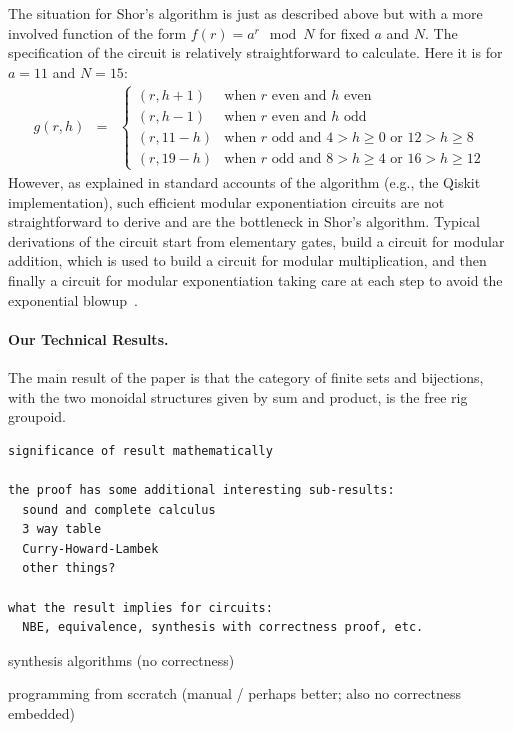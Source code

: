 The situation for Shor's algorithm is just as described above but with a more involved function of the form $f(r) = a^{r} \mod N$ for fixed $a$ and $N$. The specification of the circuit is relatively straightforward to calculate. Here it is for $a=11$ and $N=15$:
\[\begin{array}{rcll}
g(r,h) &=& \left\{ \begin{array}{ll}
                     (r,h+1) & \mbox{when~$r$~even~and~$h$~even} \\
                     (r,h-1) & \mbox{when~$r$~even~and~$h$~odd} \\
                     (r,11-h) & \mbox{when~$r$~odd~and~$4 > h \geq 0$~or~$12 > h \geq 8$} \\
                     (r,19-h) & \mbox{when~$r$~odd~and~$8 > h \geq 4$~or~$16 > h \geq 12$}
                                \end{array}\right.
\end{array}\]
However, as explained in standard accounts of the algorithm (e.g., the Qiskit implementation), such efficient modular exponentiation circuits are not straightforward to derive and are the bottleneck in Shor’s algorithm. Typical derivations of the circuit start from elementary gates, build a circuit for modular addition, which is used to build a circuit for modular multiplication, and then finally a circuit for modular exponentiation taking care at each step to avoid the exponential blowup~\cite{shorefficient}.

\paragraph*{Our Technical Results.} The main result of the paper is that the category of finite sets and bijections,
with the two monoidal structures given by sum and product, is the free rig groupoid.

\begin{verbatim}
significance of result mathematically

the proof has some additional interesting sub-results:
  sound and complete calculus
  3 way table
  Curry-Howard-Lambek
  other things?

what the result implies for circuits:
  NBE, equivalence, synthesis with correctness proof, etc.
\end{verbatim}

synthesis algorithms (no correctness)

programming from sccratch (manual / perhaps better; also no correctness embedded)

